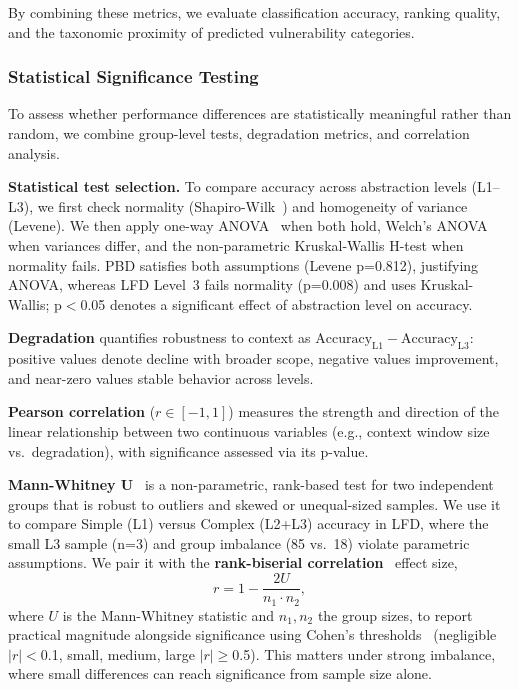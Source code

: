 \documentclass[lettersize,journal]{IEEEtran}
\begin{document}
By combining these metrics, we evaluate classification accuracy, ranking quality, and the taxonomic proximity of predicted vulnerability categories.


\subsubsection{Statistical Significance Testing}
To assess whether performance differences are statistically meaningful rather than random, we combine group-level tests, degradation metrics, and correlation analysis.

\textbf{Statistical test selection.} To compare accuracy across abstraction levels (L1--L3), we first check normality (Shapiro-Wilk~\cite{shapiro1965analysis}) and homogeneity of variance (Levene). We then apply one-way ANOVA~\cite{fisher1970statistical} when both hold, Welch's ANOVA when variances differ, and the non-parametric Kruskal-Wallis H-test when normality fails. PBD satisfies both assumptions (Levene p=0.812), justifying ANOVA, whereas LFD Level~3 fails normality (p=0.008) and uses Kruskal-Wallis; p$<$0.05 denotes a significant effect of abstraction level on accuracy.

\textbf{Degradation} quantifies robustness to context as $\text{Accuracy}_{\text{L1}}-\text{Accuracy}_{\text{L3}}$: positive values denote decline with broader scope, negative values improvement, and near-zero values stable behavior across levels.

\textbf{Pearson correlation} ($r\in[-1,1]$) measures the strength and direction of the linear relationship between two continuous variables (e.g., context window size vs.\ degradation), with significance assessed via its p-value.

\textbf{Mann-Whitney U}~\cite{mann1947test} is a non-parametric, rank-based test for two independent groups that is robust to outliers and skewed or unequal-sized samples. We use it to compare Simple (L1) versus Complex (L2+L3) accuracy in LFD, where the small L3 sample (n=3) and group imbalance (85 vs.\ 18) violate parametric assumptions. We pair it with the \textbf{rank-biserial correlation}~\cite{kerby2014simple} effect size,
\begin{equation}
    r = 1 - \frac{2U}{n_1 \cdot n_2},
\end{equation}
where $U$ is the Mann-Whitney statistic and $n_1,n_2$ the group sizes, to report practical magnitude alongside significance using Cohen's thresholds~\cite{cohen1988statistical} (negligible $|r|<$0.1, small, medium, large $|r|\geq$0.5). This matters under strong imbalance, where small differences can reach significance from sample size alone.
\end{document}
